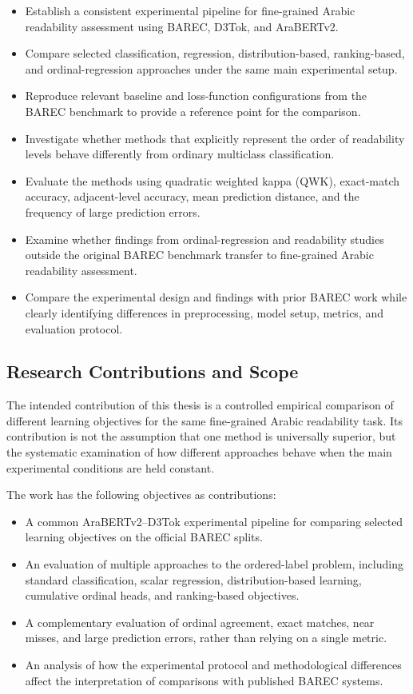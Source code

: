 \documentclass[12pt]{report}
\begin{document}
\begin{itemize}
    \item Establish a consistent experimental pipeline for fine-grained Arabic readability assessment using BAREC, D3Tok, and AraBERTv2.
    \item Compare selected classification, regression, distribution-based, ranking-based, and ordinal-regression approaches under the same main experimental setup.
    \item Reproduce relevant baseline and loss-function configurations from the BAREC benchmark to provide a reference point for the comparison.
    \item Investigate whether methods that explicitly represent the order of readability levels behave differently from ordinary multiclass classification.
    \item Evaluate the methods using quadratic weighted kappa (QWK), exact-match accuracy, adjacent-level accuracy, mean prediction distance, and the frequency of large prediction errors.
    \item Examine whether findings from ordinal-regression and readability studies outside the original BAREC benchmark transfer to fine-grained Arabic readability assessment.
    \item Compare the experimental design and findings with prior BAREC work while clearly identifying differences in preprocessing, model setup, metrics, and evaluation protocol.
\end{itemize}

\subsection{Research Contributions and Scope}

The intended contribution of this thesis is a controlled empirical comparison of different learning objectives for the same fine-grained Arabic readability task. Its contribution is not the assumption that one method is universally superior, but the systematic examination of how different approaches behave when the main experimental conditions are held constant.

The work has the following objectives as contributions:

\begin{itemize}
    \item A common AraBERTv2--D3Tok experimental pipeline for comparing selected learning objectives on the official BAREC splits.
    \item An evaluation of multiple approaches to the ordered-label problem, including standard classification, scalar regression, distribution-based learning, cumulative ordinal heads, and ranking-based objectives.
    \item A complementary evaluation of ordinal agreement, exact matches, near misses, and large prediction errors, rather than relying on a single metric.
    \item An analysis of how the experimental protocol and methodological differences affect the interpretation of comparisons with published BAREC systems.
\end{itemize}
\end{document}
